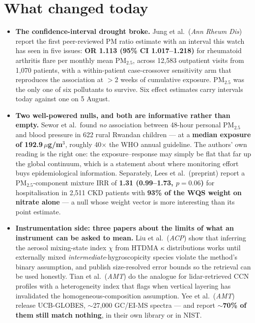 \documentclass[10pt]{article}
\begin{document}
\section*{\sffamily\bfseries\color{Deep}What changed today}
\vspace{-1.5mm}{\color{Amber}\rule{\linewidth}{1.1pt}}\vspace{2.5mm}

\footnotesize
\begin{itemize}
\item \textbf{The confidence-interval drought broke.} Jung et al.\ (\textit{Ann Rheum
Dis}) report the first peer-reviewed PM ratio estimate with an interval this watch has
seen in five issues: \textbf{OR 1.113 (95\% CI 1.017--1.218)} for rheumatoid arthritis
flare per monthly mean PM$_{2.5}$, across 12{,}583 outpatient visits from 1{,}070
patients, with a within-patient case-crossover sensitivity arm that reproduces the
association at $>$2 weeks of cumulative exposure. PM$_{2.5}$ was the only one of six
pollutants to survive. Six effect estimates carry intervals today against one on 5
August.

\item \textbf{Two well-powered nulls, and both are informative rather than empty.}
Sewor et al.\ found \emph{no} association between 48-hour personal PM$_{2.5}$ and blood
pressure in 622 rural Rwandan children --- at a \textbf{median exposure of
192.9\,$\mu$g/m$^3$}, roughly 40$\times$ the WHO annual guideline. The authors' own
reading is the right one: the exposure--response may simply be flat that far up the
global continuum, which is a statement about where monitoring effort buys epidemiological
information. Separately, Lees et al.\ (preprint) report a PM$_{2.5}$-component mixture
IRR of \textbf{1.31 (0.99--1.73, $p=0.06$)} for hospitalisation in 2{,}511 CKD patients
with \textbf{93\% of the WQS weight on nitrate alone} --- a null whose weight vector is
more interesting than its point estimate.

\item \textbf{Instrumentation side: three papers about the limits of what an instrument
can be asked to mean.} Liu et al.\ (\textit{ACP}) show that inferring the aerosol
mixing-state index $\chi$ from HTDMA $\kappa$ distributions works until externally mixed
\emph{intermediate}-hygroscopicity species violate the method's binary assumption, and
publish size-resolved error bounds so the retrieval can be used honestly. Tian et al.\
(\textit{AMT}) do the analogue for lidar-retrieved CCN profiles with a heterogeneity index
that flags when vertical layering has invalidated the homogeneous-composition assumption.
Yee et al.\ (\textit{AMT}) release UCB-GLOBES, $\sim$27{,}000 GC/EI-MS spectra --- and
report \textbf{$\sim$70\% of them still match nothing}, in their own library or in NIST.


\end{itemize}
\end{document}
